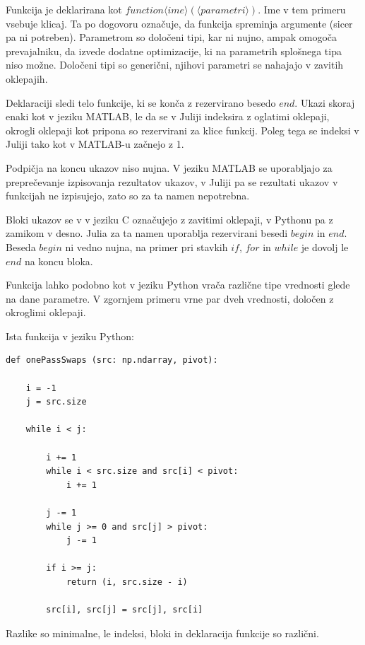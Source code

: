 \documentclass[journal,a4paper,twoside]{sty/IEEEtran}
\begin{document}
Funkcija je deklarirana kot $function \langle ime\rangle (\langle parametri\rangle )$.
Ime v tem primeru vsebuje klicaj.
Ta po dogovoru označuje, da funkcija spreminja argumente (sicer pa ni potreben).
Parametrom so določeni tipi, kar ni nujno, ampak omogoča prevajalniku, da izvede dodatne optimizacije, ki na parametrih splošnega tipa niso možne.
Določeni tipi so generični, njihovi parametri se nahajajo v zavitih oklepajih.

Deklaraciji sledi telo funkcije, ki se konča z rezervirano besedo $end$.
Ukazi skoraj enaki kot v jeziku MATLAB, le da se v Juliji indeksira z oglatimi oklepaji, okrogli oklepaji kot pripona so rezervirani za klice funkcij.
Poleg tega se indeksi v Juliji tako kot v MATLAB-u začnejo z 1.

Podpičja na koncu ukazov niso nujna.
V jeziku MATLAB se uporabljajo za preprečevanje izpisovanja rezultatov ukazov, v Juliji pa se rezultati ukazov v funkcijah ne izpisujejo, zato so
	za ta namen nepotrebna.

Bloki ukazov se v v jeziku C označujejo z zavitimi oklepaji, v Pythonu pa z zamikom v desno.
Julia za ta namen uporablja rezervirani besedi $begin$ in $end$.
Beseda $begin$ ni vedno nujna, na primer pri stavkih $if$, $for$ in $while$ je dovolj le $end$ na koncu bloka.

Funkcija lahko podobno kot v jeziku Python vrača različne tipe vrednosti glede na dane parametre.
V zgornjem primeru vrne par dveh vrednosti, določen z okroglimi oklepaji.

Ista funkcija v jeziku Python:
\begin{lstlisting}
def onePassSwaps (src: np.ndarray, pivot):

    i = -1
    j = src.size

    while i < j:

        i += 1
        while i < src.size and src[i] < pivot:
            i += 1

        j -= 1
        while j >= 0 and src[j] > pivot:
            j -= 1

        if i >= j:
            return (i, src.size - i)

        src[i], src[j] = src[j], src[i]
\end{lstlisting}

Razlike so minimalne, le indeksi, bloki in deklaracija funkcije so različni.
\end{document}
